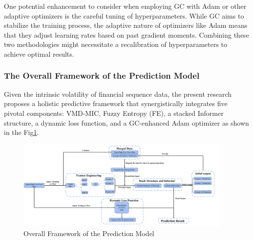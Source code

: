 \documentclass[sn-mathphys,Numbered]{sn-jnl}
\theoremstyle{thmstyleone}%
\theoremstyle{thmstyletwo}%
\theoremstyle{thmstylethree}%
\begin{document}
One potential enhancement to consider when employing GC with Adam or other adaptive optimizers is the careful tuning of hyperparameters. While GC aims to stabilize the training process, the adaptive nature of optimizers like Adam means that they adjust learning rates based on past gradient moments. Combining these two methodologies might necessitate a recalibration of hyperparameters to achieve optimal results.

\subsubsection{ The Overall Framework of the Prediction Model}\label{subsec5}

Given the intrinsic volatility of financial sequence data, the present research proposes a holistic predictive framework that synergistically integrates five pivotal components: VMD-MIC, Fuzzy Entropy (FE), a stacked Informer structure, a dynamic loss function, and a GC-enhanced Adam optimizer as shown in the Fig\ref{all}.

\begin{figure}[h]
    \centering
    \includegraphics[width=0.95\textwidth]{pngs/all.png}
    \caption{ Overall Framework of the Prediction Model}
    \label{all}
\end{figure}
\end{document}
